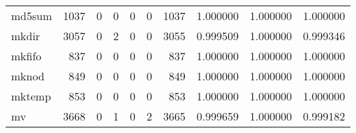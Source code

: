 \begin{longtable}{lrrrrrrrrr}
md5sum    &                                               1037 &                                                  0 &                                                  0 &                                                  0 &                                                  0 &                                               1037 &                                           1.000000 &                               1.000000 &                             1.000000 \\
mkdir     &                                               3057 &                                                  0 &                                                  2 &                                                  0 &                                                  0 &                                               3055 &                                           0.999509 &                               1.000000 &                             0.999346 \\
mkfifo    &                                                837 &                                                  0 &                                                  0 &                                                  0 &                                                  0 &                                                837 &                                           1.000000 &                               1.000000 &                             1.000000 \\
mknod     &                                                849 &                                                  0 &                                                  0 &                                                  0 &                                                  0 &                                                849 &                                           1.000000 &                               1.000000 &                             1.000000 \\
mktemp    &                                                853 &                                                  0 &                                                  0 &                                                  0 &                                                  0 &                                                853 &                                           1.000000 &                               1.000000 &                             1.000000 \\
mv        &                                               3668 &                                                  0 &                                                  1 &                                                  0 &                                                  2 &                                               3665 &                                           0.999659 &                               1.000000 &                             0.999182 \\

\end{longtable}
